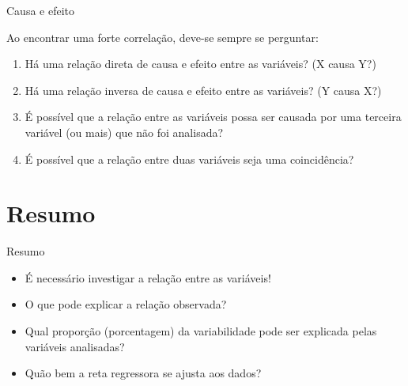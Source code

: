 \documentclass{beamer}
\begin{document}
\begin{frame}{Causa e efeito}

  Ao encontrar uma forte correlação, deve-se sempre se perguntar:

  \begin{enumerate}
  \item Há uma relação direta de causa e efeito entre as variáveis? (X
    causa Y?)

  \item Há uma relação inversa de causa e efeito entre as variáveis?
    (Y causa X?)

  \item É possível que a relação entre as variáveis possa ser causada
    por uma terceira variável (ou mais) que não foi analisada?

  \item É possível que a relação entre duas variáveis seja uma
    coincidência?
  \end{enumerate}
\end{frame}

\section{Resumo}
\begin{frame}{Resumo}
  \begin{itemize}
  \item É necessário investigar a relação entre as variáveis!
  \item O que pode explicar a relação observada?
  \item Qual proporção (porcentagem) da variabilidade pode ser
    explicada pelas variáveis analisadas?
  \item Quão bem a reta regressora se ajusta aos dados?
  \end{itemize}
\end{frame}

\end{document}
